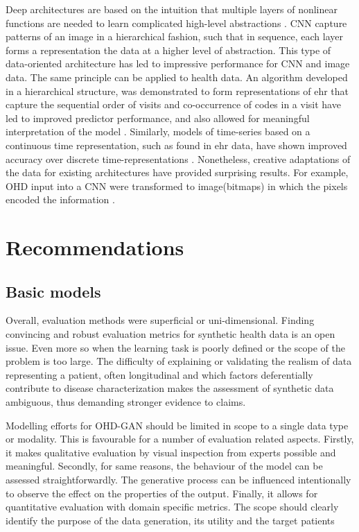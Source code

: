 Deep architectures are based on the intuition that multiple layers of nonlinear functions are needed to learn complicated high-level abstractions \cite{Bengio_2009}. CNN capture patterns of an image in a hierarchical fashion, such that in sequence, each layer forms a representation the data at a higher level of abstraction. This type of data-oriented architecture has led to impressive performance for CNN and image data. The same principle can be applied to health data. An algorithm developed in a hierarchical structure, was demonstrated to form representations of \gls{ehr} that capture the sequential order of visits and co-occurrence of codes in a visit have led to improved predictor performance, and also allowed for meaningful interpretation of the model \cite{choi2016multi}. Similarly, models of time-series based on a continuous time representation, such as found in \gls{ehr} data, have shown improved accuracy over discrete time-representations \cite{rubanova2019latent,de2019gru}. Nonetheless, creative adaptations of the data for existing architectures have provided surprising results. For example, OHD input into a CNN were transformed to image(bitmaps) in which the pixels encoded the information \cite{Fukae2020}.

\section{Recommendations}\label{sec:recommend}
\subsection{Basic models}\label{sec:basic}

Overall, evaluation methods were superficial or uni-dimensional. Finding convincing and robust evaluation metrics for synthetic health data is an open issue. Even more so when the learning task is poorly defined or the scope of the problem is too large. The difficulty of explaining or validating the realism of data representing a patient, often longitudinal and which factors deferentially contribute to disease characterization makes the assessment of synthetic data ambiguous, thus demanding stronger evidence to claims.\par
Modelling efforts for OHD-GAN should be limited in scope to a single data type or modality. This is favourable for a number of evaluation related aspects. Firstly, it makes qualitative evaluation by visual inspection from experts possible and meaningful. Secondly, for same reasons, the behaviour of the model can be assessed straightforwardly. The generative process can be influenced intentionally to observe the effect on the properties of the output. Finally, it allows for quantitative evaluation with domain specific metrics. The scope should clearly identify the purpose of the data generation, its utility and the target patients\cite{Capobianco2020,Kappen_2016, Kappen_2016a}

